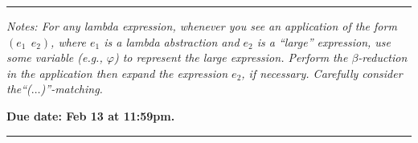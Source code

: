\documentclass[11pt]{article}
\newcommand{\appl}[2]{(#1\ \ #2)}
\begin{document}
\hrule

\smallskip
\noindent
\emph{Notes: For any lambda expression, whenever you see an application
of the form $\appl{e_1}{e_2}$, where $e_1$ is a lambda abstraction and
$e_2$ is a ``large'' expression, use some variable (e.g., $\varphi$)
to represent the large expression. Perform the $\beta$-reduction in
the application then expand the expression $e_2$, if necessary.
Carefully consider the``($\ldots$)''-matching.}

\begin{center}
\textbf{Due date: Feb 13 at 11:59pm.}
\end{center}
\smallskip

\hrule
\end{document}
